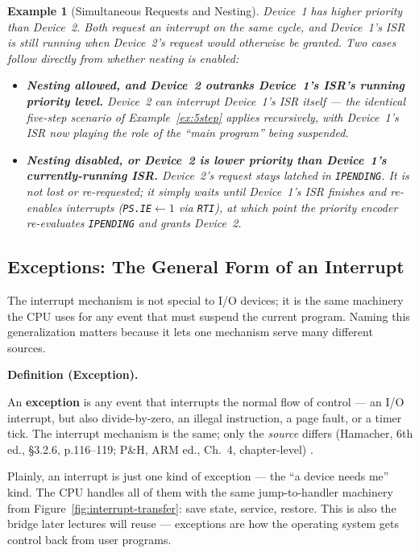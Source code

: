 \documentclass[11pt]{article}
\newtheorem{example}{Example}[section]
\newenvironment{definitionbox}[1]{%
  \par\noindent\textbf{Definition (#1).}\ \itshape
}{\par\vspace{0.3em}}
\begin{document}
\begin{example}[Simultaneous Requests and Nesting]
\label{ex:nesting}
Device~1 has higher priority than Device~2. Both request an interrupt on the same cycle, and Device~1's ISR is still running when Device~2's request would otherwise be granted. Two cases follow directly from whether \emph{nesting} is enabled:
\begin{itemize}
  \item \textbf{Nesting allowed, and Device~2 outranks Device~1's ISR's running priority level.} Device~2 can interrupt Device~1's ISR itself --- the identical five-step scenario of Example~\ref{ex:5step} applies recursively, with Device~1's ISR now playing the role of the ``main program'' being suspended.
  \item \textbf{Nesting disabled, or Device~2 is lower priority than Device~1's currently-running ISR.} Device~2's request stays latched in \texttt{IPENDING}. It is not lost or re-requested; it simply waits until Device~1's ISR finishes and re-enables interrupts (\texttt{PS.IE}$\gets1$ via \texttt{RTI}), at which point the priority encoder re-evaluates \texttt{IPENDING} and grants Device~2.
\end{itemize}
\end{example}

\subsection{Exceptions: The General Form of an Interrupt}

The interrupt mechanism is not special to I/O devices; it is the same machinery the CPU uses for any event that must suspend the current program. Naming this generalization matters because it lets one mechanism serve many different sources.

\begin{definitionbox}{Exception}
An \textbf{exception} is any event that interrupts the normal flow of control --- an I/O interrupt, but also divide-by-zero, an illegal instruction, a page fault, or a timer tick. The interrupt mechanism is the same; only the \emph{source} differs (Hamacher, 6th ed., \S3.2.6, p.116--119; P\&H, ARM ed., Ch.~4, chapter-level) \cite{Hamacher2002_computer_organization,PattersonHennessy2017_computer_organization_design}.
\end{definitionbox}

Plainly, an interrupt is just one kind of exception --- the ``a device needs me'' kind. The CPU handles all of them with the same jump-to-handler machinery from Figure~\ref{fig:interrupt-transfer}: save state, service, restore. This is also the bridge later lectures will reuse --- exceptions are how the operating system gets control back from user programs.
\end{document}
